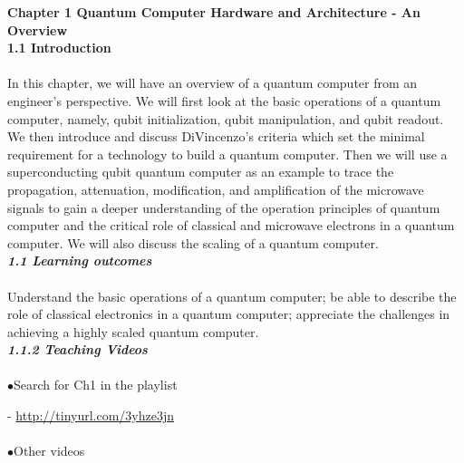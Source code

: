 \documentclass{article}
\newcommand{\bfit}[1]{\textit{\textbf{#1}}}
\begin{document}
\noindent
\textbf{\Large 
Chapter 1
Quantum Computer Hardware and Architecture - An Overview
}
\\[30pt]
\textbf{\large
1.1 Introduction}
\\\\
In this chapter, we will have an overview of a quantum computer from an engineer’s perspective. We will first look at the basic operations of a quantum computer, namely, qubit initialization, qubit manipulation, and qubit readout. We then introduce and discuss DiVincenzo’s criteria which set the minimal requirement for a technology to build a quantum  computer. Then we will use a superconducting qubit quantum computer as an example to trace the propagation, attenuation, modification, and amplification of the microwave signals to gain a deeper understanding of the operation principles of quantum computer and the critical role of classical and microwave electrons in a quantum computer. We will also discuss the scaling of a quantum computer.
\\[20pt]
\bfit{\large
1.1 Learning outcomes
}
\\\\
Understand the basic operations of a quantum computer; be able to describe the role of classical electronics in a quantum computer; appreciate the challenges in achieving a highly scaled quantum computer.
\\[20pt]
\bfit{\large
1.1.2 Teaching Videos}
\\\\
$\bullet$Search for Ch1 in the playlist

- \url{http://tinyurl.com/3yhze3jn}\\\\
$\bullet$Other videos
\end{document}
